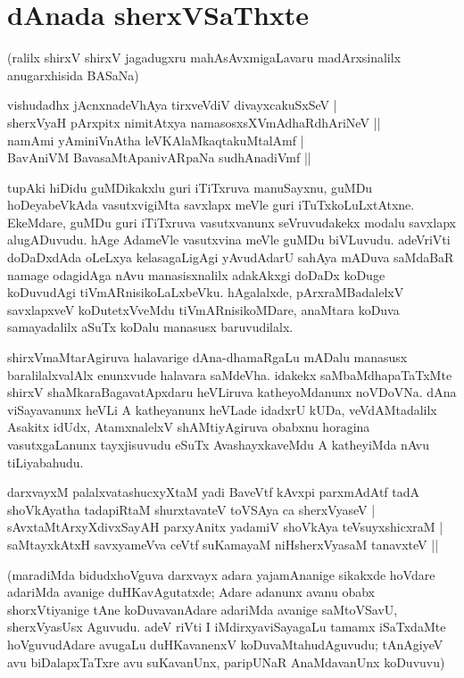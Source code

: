 \chapter{dAnada sherxVSaThxte}\label{chap14}

({}ralilx shirxV shirxV jagadugxru mahAsAvxmigaLavaru madArxsinalilx anugarxhisida BASaNa)

\begin{shloka}
vishudadhx jAcnxnadeVhAya tirxveVdiV divayxcakuSxSeV |\\
sherxVyaH pArxpitx nimitAtxya namasosxsXVmAdhaRdhAriNeV ||\\
namAmi yAminiVnAtha leVKAlaMkaqtakuMtalAmf |\\
BavAniVM BavasaMtApanivARpaNa sudhAnadiVmf ||
\end{shloka}

tupAki hiDidu guMDikakxlu guri iTiTxruva manuSayxnu, guMDu hoDeyabeVkAda vasutxvigiMta savxlapx meVle guri iTuTxkoLuLxtAtxne. EkeMdare, guMDu guri iTiTxruva vasutxvanunx seVruvudakekx modalu savxlapx alugADuvudu. hAge AdameVle vasutxvina meVle guMDu biVLuvudu. adeVriVti doDaDxdAda oLeLxya kelasagaLigAgi yAvudAdarU sahAya mADuva saMdaBaR namage odagidAga nAvu manasisxnalilx adakAkxgi doDaDx koDuge koDuvudAgi tiVmARnisikoLaLxbeVku. hAgalalxde, pArxraMBadalelxV savxlapxveV koDutetxVveMdu tiVmARnisikoMDare, anaMtara koDuva samayadalilx aSuTx koDalu manasusx baruvudilalx.

shirxVmaMtarAgiruva halavarige dAna-dhamaRgaLu mADalu manasusx baralilalxvalAlx enunxvude halavara saMdeVha. idakekx saMbaMdhapaTaTxMte shirxV shaMkaraBagavatApxdaru heVLiruva katheyoMdanunx noVDoVNa. dAna viSayavanunx heVLi A katheyanunx heVLade idadxrU kUDa, veVdAMtadalilx Asakitx idUdx, AtamxnalelxV shAMtiyAgiruva obabxnu horagina vasutxgaLanunx tayxjisuvudu eSuTx AvashayxkaveMdu A katheyiMda nAvu tiLiyabahudu.

\begin{shloka}
darxvayxM palalxvatashucxyXtaM yadi BaveVtf kAvxpi parxmAdAtf tadA\\
shoVkAyatha tadapiRtaM shurxtavateV toVSAya ca sherxVyaseV |\\
sAvxtaMtArxyXdivxSayAH parxyAnitx yadamiV shoVkAya teVsuyxshicxraM |\\
saMtayxkAtxH savxyameVva ceVtf suKamayaM niHsherxVyasaM tanavxteV ||
\end{shloka}

(maradiMda bidudxhoVguva darxvayx adara yajamAnanige sikakxde hoVdare adariMda avanige duHKavAgutatxde; Adare adanunx avanu obabx shorxVtiyanige tAne koDuvavanAdare adariMda avanige saMtoVSavU, sherxVyasUsx Aguvudu. adeV riVti I iMdirxyaviSayagaLu tamamx iSaTxdaMte hoVguvudAdare avugaLu duHKavanenxV koDuvaMtahudAguvudu; tAnAgiyeV avu biDalapxTaTxre avu suKavanUnx, paripUNaR AnaMdavanUnx koDuvuvu)

